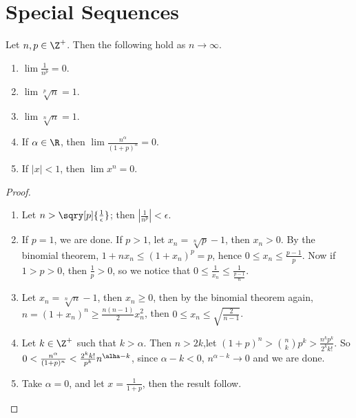 
\section{Special Sequences}

\begin{theorem}\label{3.5.1}
    Let $n, p \in \Z^+$. Then the following hold as  $n \rightarrow \infty$.
        \begin{enumerate}[label=(\arabic*)]
            \item $\lim{\frac{1}{n^p}}=0$.

            \item $\lim{\sqrt[p]{n}}=1$.

            \item $\lim{\sqrt[n]{n}}=1$.

            \item If $\alpha \in \R$, then  $\lim{\frac{n^{\alpha}}{(1+p)^n}}=0$.

            \item If $|x|<1$, then  $\lim{x^n}=0$.
        \end{enumerate}
\end{theorem}
\begin{proof}
   \begin{enumerate}[label=(\arabic*)]
       \item Let $n>\sqry[p]{\frac{1}{\epsilon}}$; then $|\frac{1}{n^p}|<\epsilon$.

       \item If $p=1$, we are done. If  $p>1$, let  $x_n=\sqrt[n]{p}-1$, then  $x_n>0$. 
           By the binomial theorem, $1+nx_n \leq (1+x_n)^p=p$, hence $0 \leq x_n \leq \frac{p-1}{p}$. 
           Now if $1>p>0$, then  $ \frac{1}{p}>0$, so we notice that $0 \leq \frac{1}{x_n} \leq \frac{1}{\frac{p-1}{n}}$.

       \item Let $x_n=\sqrt[n]{n}-1$, then  $x_n \geq 0$, then by the binomial theorem again, 
           $n=(1+x_n)^n \geq \frac{n(n-1)}{2}x_n^2$, then $0 \leq x_n \leq \sqrt{\frac{2}{n-1}}$.

       \item Let $k \in \Z^+$ such that  $k>\alpha$. Then  $n>2k$,let  $(1+p)^n> {n \choose k}p^k>
           \frac{n^kp^k}{2^kk!}$. So $0<\frac{n^{\alpha}}{(1+p)^n}<\frac{2^kk!}{p^k}n^{\alha-k}$, since 
           $\alpha-k<0$,  $n^{\alpha-k} \rightarrow 0$ and we are done.

       \item Take  $\alpha=0$, and let  $x=\frac{1}{1+p}$, then the result follow.
   \end{enumerate} 		
\end{proof}
